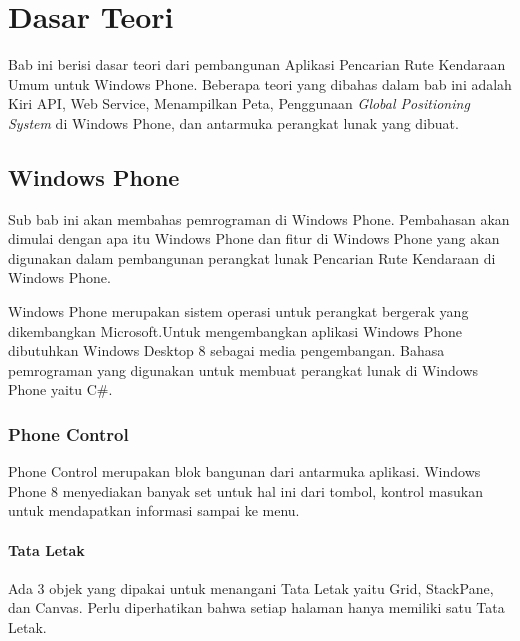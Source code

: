 \chapter{Dasar Teori}
\label{chap:teori}
Bab ini berisi dasar teori dari pembangunan Aplikasi Pencarian Rute Kendaraan Umum untuk Windows Phone. Beberapa teori yang dibahas dalam bab ini  adalah Kiri API, Web Service, Menampilkan Peta, Penggunaan \textit{Global Positioning System} di Windows Phone, dan antarmuka perangkat lunak yang dibuat. 

\section{Windows Phone}
\label{sec:Windows Phone}
\hspace{0.5cm} Sub bab ini akan membahas pemrograman di Windows Phone. Pembahasan akan dimulai dengan apa itu Windows Phone dan fitur di Windows Phone yang akan digunakan dalam pembangunan perangkat lunak Pencarian Rute Kendaraan di Windows Phone. 

Windows Phone merupakan sistem operasi untuk perangkat bergerak yang dikembangkan Microsoft.\footnotemark[1] Untuk mengembangkan aplikasi Windows Phone dibutuhkan Windows Desktop 8 sebagai media pengembangan. Bahasa pemrograman yang digunakan untuk membuat perangkat lunak di Windows Phone yaitu C\#.  

\subsection{Phone Control}
\label{subsec:Phone Control}
\hspace{0.5cm} Phone Control merupakan blok bangunan dari antarmuka aplikasi. Windows Phone 8 menyediakan banyak set untuk hal ini dari tombol, kontrol masukan untuk mendapatkan informasi sampai ke menu. 

\subsubsection{Tata Letak}
\label{subsubsec:Tata Letak}

\hspace{0.5cm} Ada 3 objek yang dipakai untuk menangani Tata Letak yaitu Grid, StackPane, dan Canvas. Perlu diperhatikan bahwa setiap halaman hanya memiliki satu Tata Letak.

